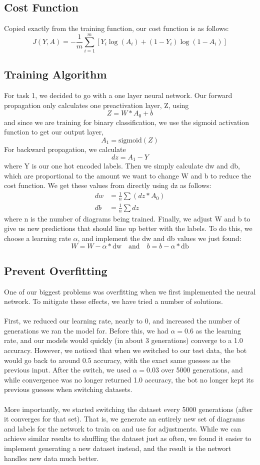 \documentclass[12pt]{article}
\begin{document}
\subsection*{Cost Function}
Copied exactly from the training function, our cost function is as follows:
\[
    J(Y, A) = -\frac{1}{m} \sum_{i=1}^{m} \left[ Y_i \log(A_i) + (1 - Y_i) \log(1 - A_i) \right]
\] 
\subsection*{Training Algorithm}
For task 1, we decided to go with a one layer neural network. Our forward propagation only calculates one 
preactivation layer, Z, using 
\[
Z = W*A_0 + b
\] 
and since we are training for binary classification, we use the sigmoid activation function to get our 
output layer, 
\[
A_1 = \text{sigmoid}(Z)
\] 
For backward propagation, we calculate 
\[
dz = A_1 - Y
\]  
where Y is our one hot encoded labels. Then we simply calculate dw and db, which are proportional to the  
amount we want to change W and b to reduce the cost function. We get these values from directly using dz as follows:
\begin{align*}
    dw &= \frac{1}{n}\sum(dz * A_0)\\
    db &= \frac{1}{n}\sum dz
\end{align*}
where n is the number of diagrams being trained. Finally, we adjust W and b to give us new predictions that should 
line up better with the labels. To do this, we choose a learning rate $\alpha$, and implement the dw and db values we 
just found: 
\[
W = W - \alpha * \text{dw} \quad \text{and} \quad b = b - \alpha * \text{db}
\]  

\subsection*{Prevent Overfitting}
One of our biggest problems was overfitting when we first implemented the neural network. To mitigate these effects, we have tried a number of solutions. 
\\
\\
First, we reduced our learning rate, nearly to 0, and increased the number of generations we ran the model for. Before this, we had $\alpha = 0.6$ as the learning 
rate, and our models would quickly (in about 3 generations) converge to a 1.0 accuracy. However, we noticed that when we switched to our test data, 
the bot would go back to around 0.5 accuracy, with the exact same guesses as the previous input. After the switch, we used $\alpha = 0.03$ over 
5000 generations, and while convergence was no longer returned 1.0 accuracy, the bot no longer kept its previous guesses when switching datasets. 
\\
\\
More importantly, we started switching the dataset every 5000 generations (after it converges for that set). That is, we generate an entirely new set of diagrams and labels 
for the network to train on and use for adjustments. While we can achieve similar results to shuffling the dataset just as often, we found 
it easier to implement generating a new dataset instead, and the result is the networt handles new data much better. 
\end{document}
